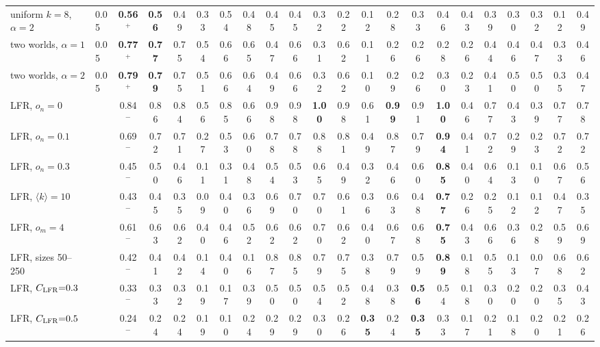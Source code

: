 \begin{table}[t]
{\begin{tabular}{llcccc|cc|cccccc|cccccccc}
uniform $k{=}8$, $\alpha{=}2$ & 0.05 & \textbf{0.56$^{+}$} & \textbf{0.56} & 0.49 & 0.33 & 0.54 & 0.48 & 0.45 & 0.45 & 0.32 & 0.22 & 0.12 & 0.28 & 0.33 & 0.46 & 0.43 & 0.39 & 0.30 & 0.32 & 0.12 & 0.49 \\
two worlds, $\alpha{=}1$ & 0.05 & \textbf{0.77$^{+}$} & \textbf{0.77} & 0.75 & 0.54 & 0.66 & 0.65 & 0.47 & 0.66 & 0.31 & 0.62 & 0.11 & 0.26 & 0.26 & 0.28 & 0.26 & 0.44 & 0.46 & 0.47 & 0.33 & 0.46 \\
two worlds, $\alpha{=}2$ & 0.05 & \textbf{0.79$^{+}$} & \textbf{0.79} & 0.75 & 0.51 & 0.66 & 0.64 & 0.49 & 0.66 & 0.32 & 0.62 & 0.10 & 0.29 & 0.26 & 0.30 & 0.23 & 0.41 & 0.50 & 0.50 & 0.35 & 0.47 \\
\hline
LFR, $o_n{=}0$ &  & 0.84$^{-}$ & 0.86 & 0.84 & 0.56 & 0.85 & 0.66 & 0.98 & 0.98 & \textbf{1.00} & 0.98 & 0.61 & \textbf{0.99} & 0.91 & \textbf{1.00} & 0.46 & 0.77 & 0.43 & 0.39 & 0.77 & 0.78 \\
LFR, $o_n{=}0.1$ &  & 0.69$^{-}$ & 0.72 & 0.71 & 0.27 & 0.53 & 0.60 & 0.78 & 0.78 & 0.88 & 0.81 & 0.49 & 0.87 & 0.79 & \textbf{0.94} & 0.41 & 0.72 & 0.29 & 0.23 & 0.72 & 0.72 \\
LFR, $o_n{=}0.3$ &  & 0.45$^{-}$ & 0.50 & 0.46 & 0.11 & 0.31 & 0.48 & 0.54 & 0.53 & 0.65 & 0.49 & 0.32 & 0.46 & 0.60 & \textbf{0.85} & 0.40 & 0.64 & 0.13 & 0.10 & 0.67 & 0.56 \\
LFR, $\langle k\rangle{=}10$ &  & 0.43$^{-}$ & 0.45 & 0.35 & 0.09 & 0.40 & 0.36 & 0.69 & 0.70 & 0.70 & 0.61 & 0.36 & 0.63 & 0.48 & \textbf{0.77} & 0.26 & 0.25 & 0.12 & 0.12 & 0.47 & 0.35 \\
LFR, $o_m{=}4$ &  & 0.61$^{-}$ & 0.63 & 0.62 & 0.40 & 0.46 & 0.52 & 0.62 & 0.62 & 0.70 & 0.62 & 0.40 & 0.67 & 0.68 & \textbf{0.75} & 0.43 & 0.66 & 0.36 & 0.28 & 0.59 & 0.69 \\
LFR, sizes 50--250 &  & 0.42$^{-}$ & 0.41 & 0.42 & 0.14 & 0.40 & 0.16 & 0.87 & 0.85 & 0.79 & 0.75 & 0.38 & 0.79 & 0.59 & \textbf{0.89} & 0.18 & 0.55 & 0.13 & 0.07 & 0.68 & 0.62 \\
LFR, $C_{\rm LFR}{=}0.3$ &  & 0.33$^{-}$ & 0.33 & 0.32 & 0.19 & 0.17 & 0.39 & 0.50 & 0.50 & 0.54 & 0.52 & 0.48 & 0.38 & \textbf{0.56} & 0.54 & 0.18 & 0.30 & 0.20 & 0.20 & 0.35 & 0.43 \\
LFR, $C_{\rm LFR}{=}0.5$ &  & 0.24$^{-}$ & 0.24 & 0.24 & 0.19 & 0.10 & 0.24 & 0.29 & 0.29 & 0.30 & 0.26 & \textbf{0.35} & 0.24 & \textbf{0.35} & 0.33 & 0.17 & 0.21 & 0.18 & 0.20 & 0.21 & 0.26 \\
\hline\hline
\end{tabular}}
\end{table}
